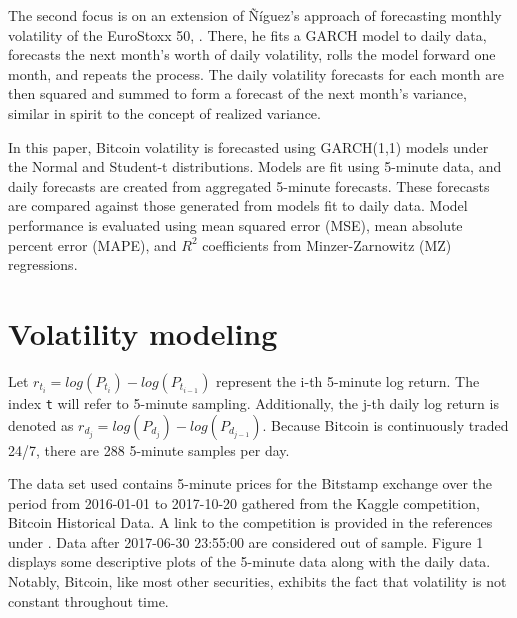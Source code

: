 \documentclass[10pt,twoside,printwatermark=false]{pinp}
\begin{document}
The second focus is on an extension of Ñíguez's approach of forecasting
monthly volatility of the EuroStoxx 50, \cite{MonthlyVol}. There, he
fits a GARCH model to daily data, forecasts the next month's worth of
daily volatility, rolls the model forward one month, and repeats the
process. The daily volatility forecasts for each month are then squared
and summed to form a forecast of the next month's variance, similar in
spirit to the concept of realized variance.

In this paper, Bitcoin volatility is forecasted using GARCH(1,1) models
under the Normal and Student-t distributions. Models are fit using
5-minute data, and daily forecasts are created from aggregated 5-minute
forecasts. These forecasts are compared against those generated from
models fit to daily data. Model performance is evaluated using mean
squared error (MSE), mean absolute percent error (MAPE), and \(R^2\)
coefficients from Minzer-Zarnowitz (MZ) regressions.

\section{Volatility modeling}\label{volatility-modeling}

Let \(r_{t_i} = log(P_{t_i}) - log(P_{t_{i-1}})\) represent the i-th
5-minute log return. The index \texttt{t} will refer to 5-minute
sampling. Additionally, the j-th daily log return is denoted as
\(r_{d_j} = log(P_{d_j}) - log(P_{d_{j-1}})\). Because Bitcoin is
continuously traded 24/7, there are 288 5-minute samples per day.

The data set used contains 5-minute prices for the Bitstamp exchange
over the period from 2016-01-01 to 2017-10-20 gathered from the Kaggle
competition, Bitcoin Historical Data. A link to the competition is
provided in the references under \cite{Kaggle}. Data after 2017-06-30
23:55:00 are considered out of sample. Figure 1 displays some
descriptive plots of the 5-minute data along with the daily data.
Notably, Bitcoin, like most other securities, exhibits the fact that
volatility is not constant throughout time.
\end{document}
